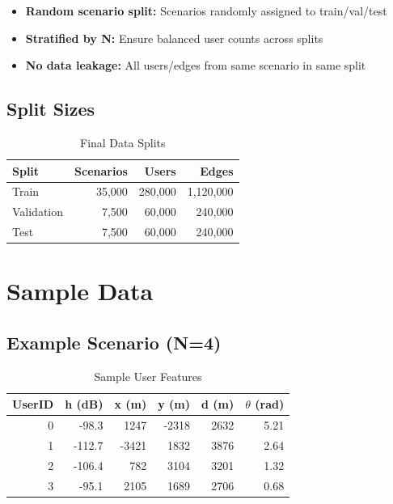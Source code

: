 \begin{itemize}
    \item \textbf{Random scenario split:} Scenarios randomly assigned to train/val/test
    \item \textbf{Stratified by N:} Ensure balanced user counts across splits
    \item \textbf{No data leakage:} All users/edges from same scenario in same split
\end{itemize}

\subsection{Split Sizes}

\begin{table}[H]
\centering
\begin{tabular}{lrrr}
\toprule
\textbf{Split} & \textbf{Scenarios} & \textbf{Users} & \textbf{Edges} \\
\midrule
Train & 35,000 & 280,000 & 1,120,000 \\
Validation & 7,500 & 60,000 & 240,000 \\
Test & 7,500 & 60,000 & 240,000 \\
\bottomrule
\end{tabular}
\caption{Final Data Splits}
\end{table}

\section{Sample Data}

\subsection{Example Scenario (N=4)}

\begin{table}[H]
\centering
\small
\begin{tabular}{rrrrrr}
\toprule
\textbf{UserID} & \textbf{h (dB)} & \textbf{x (m)} & \textbf{y (m)} & \textbf{d (m)} & \textbf{$\theta$ (rad)} \\
\midrule
0 & -98.3 & 1247 & -2318 & 2632 & 5.21 \\
1 & -112.7 & -3421 & 1832 & 3876 & 2.64 \\
2 & -106.4 & 782 & 3104 & 3201 & 1.32 \\
3 & -95.1 & 2105 & 1689 & 2706 & 0.68 \\
\bottomrule
\end{tabular}
\caption{Sample User Features}
\end{table}

